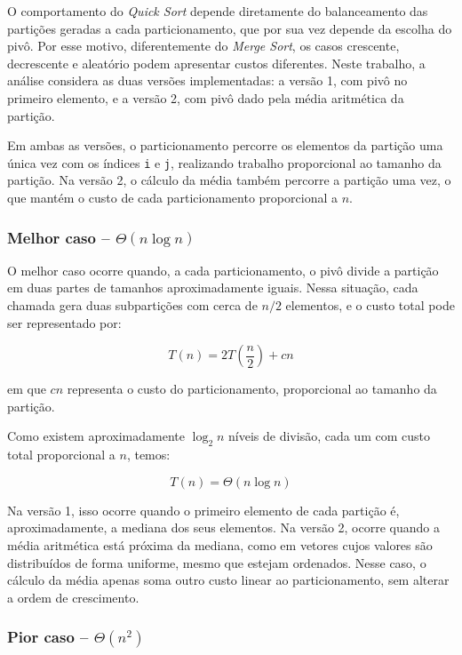 \quad O comportamento do \textit{Quick Sort} depende diretamente do
balanceamento das partições geradas a cada particionamento, que por sua
vez depende da escolha do pivô. Por esse motivo, diferentemente do
\textit{Merge Sort}, os casos crescente, decrescente e aleatório podem
apresentar custos diferentes. Neste trabalho, a análise considera as duas
versões implementadas: a versão 1, com pivô no primeiro elemento, e a
versão 2, com pivô dado pela média aritmética da partição.

\quad Em ambas as versões, o particionamento percorre os elementos da
partição uma única vez com os índices \texttt{i} e \texttt{j}, realizando
trabalho proporcional ao tamanho da partição. Na versão 2, o cálculo da
média também percorre a partição uma vez, o que mantém o custo de cada
particionamento proporcional a $n$.

\subsubsection{Melhor caso -- $\Theta(n\log n)$}

O melhor caso ocorre quando, a cada particionamento, o pivô divide a
partição em duas partes de tamanhos aproximadamente iguais. Nessa
situação, cada chamada gera duas subpartições com cerca de $n/2$
elementos, e o custo total pode ser representado por:

\begin{equation}
T(n) = 2T\left(\frac{n}{2}\right) + cn
\end{equation}

em que $cn$ representa o custo do particionamento, proporcional ao
tamanho da partição.

Como existem aproximadamente $\log_2 n$ níveis de divisão, cada um com
custo total proporcional a $n$, temos:

\begin{equation}
T(n) = \Theta(n\log n)
\end{equation}

Na versão 1, isso ocorre quando o primeiro elemento de cada partição
é, aproximadamente, a mediana dos seus elementos. Na versão 2, ocorre
quando a média aritmética está próxima da mediana, como em vetores cujos
valores são distribuídos de forma uniforme, mesmo que estejam ordenados.
Nesse caso, o cálculo da média apenas soma outro custo linear ao
particionamento, sem alterar a ordem de crescimento.

\subsubsection{Pior caso -- $\Theta(n^2)$}


